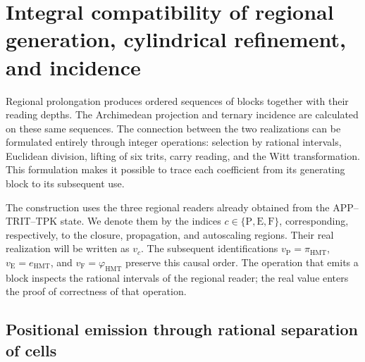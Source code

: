 
\section[Regional generation and refinement]{Integral compatibility of regional generation, cylindrical refinement, and incidence}
\label{sec:df-lectores-cilindros}

Regional prolongation produces ordered sequences of blocks together with
their reading depths. The Archimedean projection and ternary incidence
are calculated on these same sequences. The connection between the two
realizations can be formulated entirely through integer operations:
selection by rational intervals, Euclidean division, lifting of six
trits, carry reading, and the Witt transformation. This formulation makes
it possible to trace each coefficient from its generating block to its
subsequent use.

The construction uses the three regional readers already obtained from the
APP--TRIT--TPK state. We denote them by the indices
\(c\in\{\mathrm P,\mathrm E,\mathrm F\}\), corresponding, respectively,
to the closure, propagation, and autoscaling regions. Their real realization
will be written as \(v_c\). The subsequent identifications
\(v_{\mathrm P}=\pi_{\mathrm{HMT}}\),
\(v_{\mathrm E}=e_{\mathrm{HMT}}\), and
\(v_{\mathrm F}=\varphi_{\mathrm{HMT}}\) preserve this causal order.
The operation that emits a block inspects the rational intervals of the
regional reader; the real value enters the proof of correctness of that
operation.

\subsection{Positional emission through rational separation of cells}
\label{subsec:df-emision-racional}


